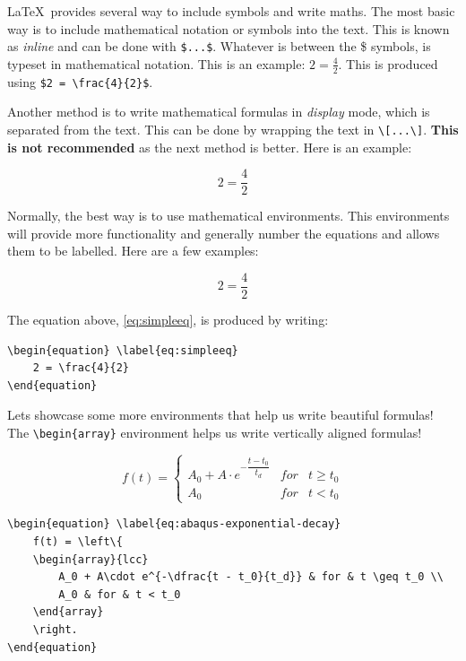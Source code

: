 \LaTeX\ provides several way to include symbols and write maths. The most basic way is to include mathematical notation or symbols into the text. This is known as \emph{inline} and can be done with \verb|$...$|. Whatever is between the \$ symbols, is typeset in mathematical notation. This is an example: $2 = \frac{4}{2}$. This is produced using \verb|$2 = \frac{4}{2}$|.

Another method is to write mathematical formulas in \emph{display} mode, which is separated from the text. This can be done by wrapping the text in \verb|\[...\]|. \textbf{This is not recommended} as the next method is better. Here is an example:

\[
	2 = \frac{4}{2}
\]

Normally, the best way is to use mathematical environments. This environments will provide more functionality and generally number the equations and allows them to be labelled. Here are a few examples:

\begin{equation} \label{eq:simpleeq}
	2 = \frac{4}{2}
\end{equation}

The equation above, \cref{eq:simpleeq}, is produced by writing:

\begin{lstlisting}[language={[LaTeX]TeX}]
\begin{equation} \label{eq:simpleeq}
	2 = \frac{4}{2}
\end{equation}
\end{lstlisting}

Lets showcase some more environments that help us write beautiful formulas! The \verb|\begin{array}| environment helps us write vertically aligned formulas!

\begin{equation} \label{eq:abaqus-exponential-decay}
f(t) = \left\{
	\begin{array}{lcc}
		A_0 + A\cdot e^{-\dfrac{t - t_0}{t_d}} & for & t \geq t_0 \\
		A_0 & for & t < t_0
	\end{array}
	\right.
\end{equation}

\begin{lstlisting}[language={[LaTeX]TeX}]
\begin{equation} \label{eq:abaqus-exponential-decay}
	f(t) = \left\{
	\begin{array}{lcc}
		A_0 + A\cdot e^{-\dfrac{t - t_0}{t_d}} & for & t \geq t_0 \\
		A_0 & for & t < t_0
	\end{array}
	\right.
\end{equation}
\end{lstlisting}


